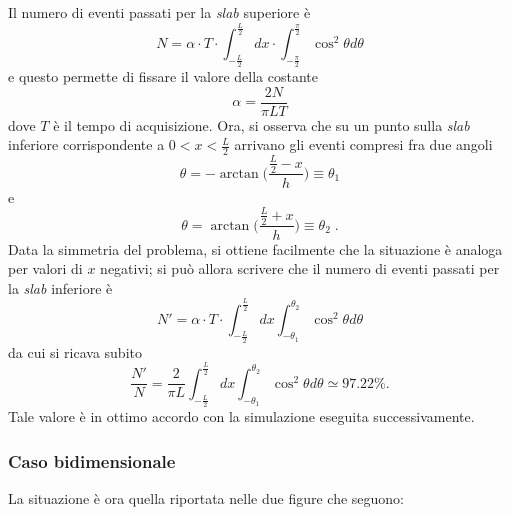 Il numero di eventi passati per la \emph{slab} superiore è $$N = \alpha \cdot T \cdot \int_{-\frac{L}{2}}^{\frac{L}{2}} dx \cdot \int_{-\frac{\pi}{2}}^{\frac{\pi}{2}} \cos ^2\theta d\theta $$e questo permette di fissare il valore della costante $$\alpha = \frac{2N}{\pi LT}$$
dove $T$ è il tempo di acquisizione. Ora, si osserva che su un punto sulla \emph{slab} inferiore corrispondente a $0<x<\frac{L}{2}$ arrivano gli eventi compresi fra due angoli $$\theta = -\arctan \bigg(\frac{\frac{L}{2}-x}{h}\bigg) \equiv \theta_1$$ e $$\theta = \arctan \bigg(\frac{\frac{L}{2}+x}{h}\bigg) \equiv \theta_2\;.$$ 
Data la simmetria del problema, si ottiene facilmente che la situazione è analoga per valori di $x$ negativi; si può allora scrivere che il numero di eventi passati per la \emph{slab} inferiore è $$N' =\alpha \cdot T \cdot \int_{-\frac{L}{2}}^{\frac{L}{2}} dx \int_{-\theta_1}^{\theta_2}  \cos ^2\theta d\theta$$ da cui si ricava subito $$\frac{N'}{N}=\frac{2}{\pi L} \int_{-\frac{L}{2}}^{\frac{L}{2}} dx \int_{-\theta_1}^{\theta_2}  \cos ^2 \theta d\theta \simeq 97.22 \%. $$ Tale valore è in ottimo accordo con la simulazione eseguita successivamente.

\subsubsection{Caso bidimensionale}
La situazione è ora quella riportata nelle due figure che seguono:
\newline


